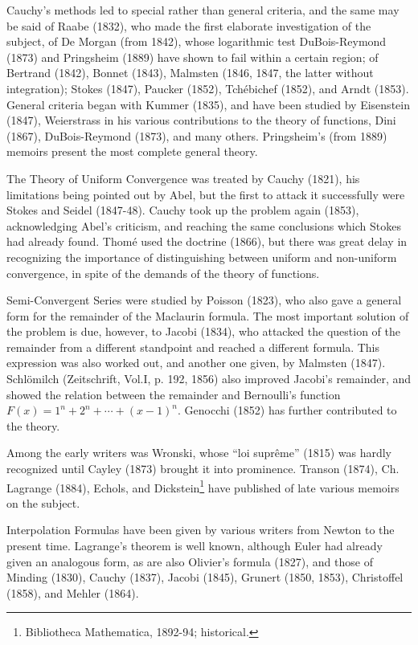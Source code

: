 \documentclass[oneside]{book}
\begin{document}
Cauchy's methods led to special rather than general criteria, and
the same may be said of Raabe (1832), who made the first elaborate
investigation of the subject, of De Morgan (from 1842), whose
logarithmic test DuBois-Reymond (1873) and Pringsheim (1889) have
shown to fail within a certain region; of Bertrand (1842), Bonnet
(1843), Malmsten (1846, 1847, the latter without integration);
Stokes (1847), Paucker (1852), Tch\'ebichef (1852), and Arndt
(1853). General criteria began with Kummer (1835), and have been
studied by Eisenstein (1847), Weierstrass in his various
contributions to the theory of functions, Dini (1867),
DuBois-Reymond (1873), and many others. Pringsheim's (from 1889)
memoirs present the most complete general theory.

The Theory of Uniform Convergence was treated by Cauchy (1821), his
limitations being pointed out by Abel, but the first to attack it
successfully were Stokes and Seidel (1847-48). Cauchy took up the
problem again (1853), acknowledging Abel's criticism, and reaching
the same conclusions which Stokes had already found. Thom\'e used the
doctrine (1866), but there was great delay in recognizing the
importance of distinguishing between uniform and non-uniform
convergence, in spite of the demands of the theory of functions.

Semi-Convergent Series were studied by Poisson (1823), who also gave
a general form for the remainder of the Maclaurin formula. The most
important solution of the problem is due, however, to Jacobi (1834),
who attacked the question of the remainder from a different
standpoint and reached a different formula. This expression was
also worked out, and another one given, by Malmsten (1847).
Schl\"omilch (Zeitschrift, Vol.I, p. 192, 1856) also
improved Jacobi's remainder, and showed the relation between the
remainder and Bernoulli's function $F(x) = 1^n + 2^n + \cdots + (x -
1)^n$. Genocchi (1852) has further contributed to the theory.

Among the early writers was Wronski, whose ``loi supr\^eme'' (1815)
was hardly recognized until Cayley (1873) brought it into
prominence. Transon (1874), Ch. Lagrange (1884), Echols, and
Dickstein\footnote{Bibliotheca Mathematica, 1892-94; historical.}
have published of late various memoirs on the subject.

Interpolation Formulas have been given by various writers from
Newton to the present time. Lagrange's theorem is well known,
although Euler had already given an analogous form, as are also
Olivier's formula (1827), and those of Minding (1830), Cauchy
(1837), Jacobi (1845), Grunert (1850, 1853), Christoffel (1858), and
Mehler (1864).
\end{document}
